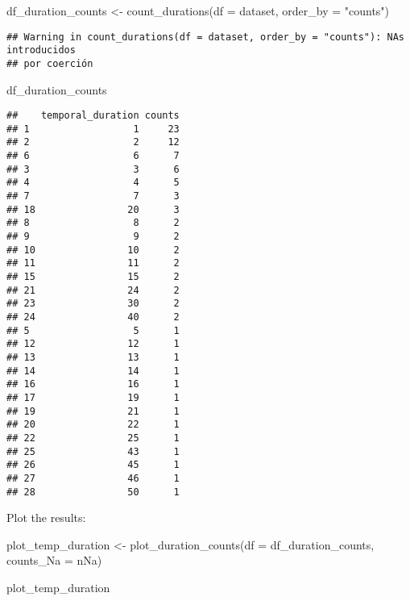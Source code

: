 \documentclass[
]{article}
\newenvironment{Shaded}{\begin{snugshade}}{\end{snugshade}}
\newcommand{\AttributeTok}[1]{\textcolor[rgb]{0.77,0.63,0.00}{#1}}
\newcommand{\FunctionTok}[1]{\textcolor[rgb]{0.00,0.00,0.00}{#1}}
\newcommand{\NormalTok}[1]{#1}
\newcommand{\OtherTok}[1]{\textcolor[rgb]{0.56,0.35,0.01}{#1}}
\newcommand{\StringTok}[1]{\textcolor[rgb]{0.31,0.60,0.02}{#1}}
\begin{document}
\begin{Shaded}
\begin{Highlighting}[]
\NormalTok{df\_duration\_counts }\OtherTok{\textless{}{-}} \FunctionTok{count\_durations}\NormalTok{(}\AttributeTok{df =}\NormalTok{ dataset, }\AttributeTok{order\_by =} \StringTok{"counts"}\NormalTok{)}
\end{Highlighting}
\end{Shaded}

\begin{verbatim}
## Warning in count_durations(df = dataset, order_by = "counts"): NAs introducidos
## por coerción
\end{verbatim}

\begin{Shaded}
\begin{Highlighting}[]
\NormalTok{df\_duration\_counts}
\end{Highlighting}
\end{Shaded}

\begin{verbatim}
##    temporal_duration counts
## 1                  1     23
## 2                  2     12
## 6                  6      7
## 3                  3      6
## 4                  4      5
## 7                  7      3
## 18                20      3
## 8                  8      2
## 9                  9      2
## 10                10      2
## 11                11      2
## 15                15      2
## 21                24      2
## 23                30      2
## 24                40      2
## 5                  5      1
## 12                12      1
## 13                13      1
## 14                14      1
## 16                16      1
## 17                19      1
## 19                21      1
## 20                22      1
## 22                25      1
## 25                43      1
## 26                45      1
## 27                46      1
## 28                50      1
\end{verbatim}

Plot the results:

\begin{Shaded}
\begin{Highlighting}[]
\NormalTok{plot\_temp\_duration }\OtherTok{\textless{}{-}} \FunctionTok{plot\_duration\_counts}\NormalTok{(}\AttributeTok{df =}\NormalTok{ df\_duration\_counts, }
                                           \AttributeTok{counts\_Na =}\NormalTok{ nNa)}

\NormalTok{plot\_temp\_duration}
\end{Highlighting}
\end{Shaded}
\end{document}
